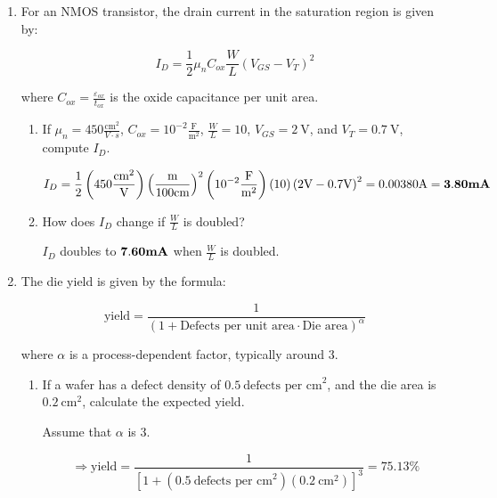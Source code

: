 \documentclass[fleqn]{article}
\begin{document}
\begin{enumerate}
		\item For an NMOS transistor, the drain current in the saturation region is given by:
		
		\begin{equation*}
			I_D = \frac{1}{2}{\mu_n}{C_{ox}}\frac{W}{L}(V_{GS}-V_{T})^2
		\end{equation*}
		
		where $C_{ox} = \frac{\varepsilon_{ox}}{t_{ox}}$ is the oxide capacitance per unit area.
		
		\begin{enumerate}
			\item If $\mu_n = 450 \frac{\text{cm}^2}{V \cdot s}$, $C_{ox} = 10^{-2}\frac{\text{F}}{\text{m}^2}$, $\frac{W}{L} = 10$, $V_{GS} = 2\ \text{V}$, and $V_T = 0.7\ \text{V}$, compute $I_D$.
			
			\begin{equation*}
				I_D = \frac{1}{2}\left(450\frac{\text{cm}^2}{\text{V}}\right)\left(\frac{\text{m}}{100\text{cm}}\right)^2\left(10^{-2}\frac{\text{F}}{\text{m}^2}\right)(10)\left(2\text{V} - 0.7\text{V}\right)^2 = 0.00380 \text{A} = \mathbf{3.80 \textbf{\text{mA}}}
			\end{equation*}
			
			\item How does $I_D$ change if $\frac{W}{L}$ is doubled?
			
			$I_D$ doubles to $\mathbf{7.60 \text{\textbf{mA}}}$ when $\frac{W}{L}$ is doubled.
			
		\end{enumerate}
		
		\item The die yield is given by the formula:
		
		\begin{equation*}
			\text{yield} = \frac{1}{(1+\text{Defects per unit area} \cdot \text{Die area})^{\alpha}}
		\end{equation*}
		
		where $\alpha$ is a process-dependent factor, typically around 3.
		
		\begin{enumerate}
			\item If a wafer has a defect density of $0.5\ \text{defects per cm}^2$, and the die area is $0.2\ \text{cm}^2$, calculate the expected yield.
			
			Assume that $\alpha$ is 3.
			
			\begin{equation*}
				\Rightarrow \text{yield} = \frac{1}{[1 + (0.5\ \text{defects per cm}^2)(0.2\ \text{cm}^2)]^3} = \mathbf{75.13\%}
			\end{equation*}
			

\end{enumerate}
\end{enumerate}
\end{document}
